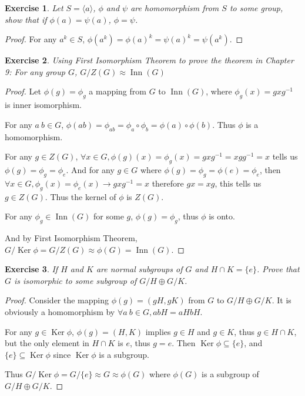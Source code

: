 \documentclass[14pt]{extarticle}
\newtheorem{exercise}{Exercise}[section]
\newcommand{\inv}[1]{#1^{-1}}
\newcommand{\1}{\{ e \}}
\newcommand{\cyc}[1]{\langle #1 \rangle}
\DeclareMathOperator{\Inn}{Inn}
\DeclareMathOperator{\Ker}{Ker}
\begin{document}
\begin{exercise}
  Let $S = \cyc{a}$, $\phi$ and $\psi$ are homomorphism
  from $S$ to some group, show that if $\phi(a) = \psi(a)$,
  $\phi = \psi$.
\end{exercise}
\begin{proof}
  For any $a^k \in S$,
  $\phi(a^k) = \phi(a)^k = \psi(a)^k = \psi(a^k)$.
\end{proof}

\begin{exercise}
  Using First Isomorphism Theorem to prove the theorem in Chapter 9:
  For any group $G$, $G/Z(G) \approx \Inn(G)$
\end{exercise}
\begin{proof}
  Let $\phi(g) = \phi_g$ a mapping from $G$ to $\Inn(G)$,
  where $\phi_g(x) = gx\inv{g}$ is inner isomorphism.

  For any $a \ b \in G$, $\phi(ab) = \phi_{ab} = \phi_a \circ \phi_b = \phi(a) \circ \phi(b)$.
  Thus $\phi$ is a homomorphism.

  For any $g \in Z(G)$, $\forall x \in G, \phi(g)(x) = \phi_g(x) = gx\inv{g} = xg\inv{g} = x$
  tells us $\phi(g) = \phi_g = \phi_e$.
  And for any $g \in G$ where $\phi(g) = \phi_g = \phi(e) = \phi_e$,
  then $\forall x \in G, \phi_g(x) = \phi_e(x) \rightarrow gx\inv{g} = x$
  therefore $gx = xg$, this tells us $g \in Z(G)$.
  Thus the kernel of $\phi$ is $Z(G)$.

  For any $\phi_g \in \Inn(G)$ for some $g$, $\phi(g) = \phi_g$,
  thus $\phi$ is onto.

  And by First Isomorphism Theorem, $G / \Ker \phi = G / Z(G) \approx \phi(G) = \Inn(G)$.
\end{proof}

\setcounter{exercise}{65}
\begin{exercise}
  If $H$ and $K$ are normal subgroups of $G$ and $H \cap K = \1$.
  Prove that $G$ is isomorphic to some subgroup of $G/H \oplus G/K$.
\end{exercise}
\begin{proof}
  Consider the mapping $\phi(g) = (gH, gK)$ from $G$ to $G/H \oplus G/K$.
  It is obviously a homomorphism by $\forall a \ b \in G, abH = aHbH$.

  For any $g \in \Ker \phi$, $\phi(g) = (H, K)$ implies $g \in H$ and $g \in K$,
  thus $g \in H \cap K$, but the only element in $H \cap K$ is $e$, 
  thus $g = e$. Then $\Ker \phi \subseteq \1$, 
  and $\1 \subseteq \Ker \phi$ since $\Ker \phi$ is a subgroup.

  Thus $G / \Ker \phi = G / \1 \approx G \approx \phi(G)$
  where $\phi(G)$ is a subgroup of $G/H \oplus G/K$.
\end{proof}
\end{document}
